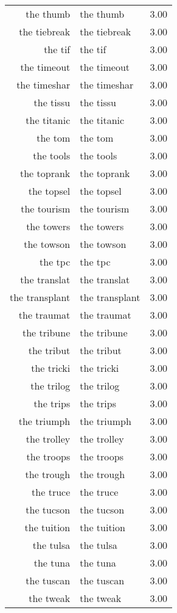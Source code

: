 \begin{table}[ht]
\begin{tabular}{rlr}
  the thumb & the thumb & 3.00 \\ 
  the tiebreak & the tiebreak & 3.00 \\ 
  the tif & the tif & 3.00 \\ 
  the timeout & the timeout & 3.00 \\ 
  the timeshar & the timeshar & 3.00 \\ 
  the tissu & the tissu & 3.00 \\ 
  the titanic & the titanic & 3.00 \\ 
  the tom & the tom & 3.00 \\ 
  the tools & the tools & 3.00 \\ 
  the toprank & the toprank & 3.00 \\ 
  the topsel & the topsel & 3.00 \\ 
  the tourism & the tourism & 3.00 \\ 
  the towers & the towers & 3.00 \\ 
  the towson & the towson & 3.00 \\ 
  the tpc & the tpc & 3.00 \\ 
  the translat & the translat & 3.00 \\ 
  the transplant & the transplant & 3.00 \\ 
  the traumat & the traumat & 3.00 \\ 
  the tribune & the tribune & 3.00 \\ 
  the tribut & the tribut & 3.00 \\ 
  the tricki & the tricki & 3.00 \\ 
  the trilog & the trilog & 3.00 \\ 
  the trips & the trips & 3.00 \\ 
  the triumph & the triumph & 3.00 \\ 
  the trolley & the trolley & 3.00 \\ 
  the troops & the troops & 3.00 \\ 
  the trough & the trough & 3.00 \\ 
  the truce & the truce & 3.00 \\ 
  the tucson & the tucson & 3.00 \\ 
  the tuition & the tuition & 3.00 \\ 
  the tulsa & the tulsa & 3.00 \\ 
  the tuna & the tuna & 3.00 \\ 
  the tuscan & the tuscan & 3.00 \\ 
  the tweak & the tweak & 3.00 \\ 

\end{tabular}
\end{table}

